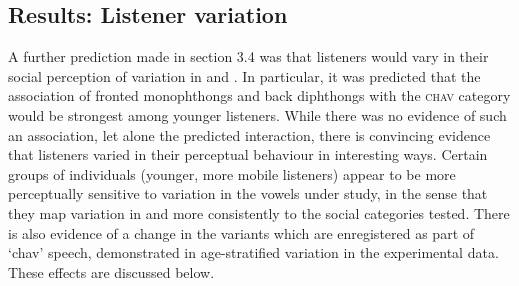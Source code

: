 \documentclass[PWPL]{article}
\begin{document}
\subsection{Results: Listener variation}
A further prediction made in section 3.4 was that listeners would vary in their social perception of variation in  and . In particular, it was predicted that the association of fronted  monophthongs and back  diphthongs with the \textsc{chav} category would be strongest among younger listeners. While there was no evidence of such an association, let alone the predicted interaction, there is convincing evidence that listeners varied in their perceptual behaviour in interesting ways. Certain groups of individuals (younger, more mobile listeners) appear to be more perceptually sensitive to variation in the vowels under study, in the sense that they map variation in  and  more consistently to the social categories tested. There is also evidence of a change in the variants which are enregistered as part of `chav' speech, demonstrated in age-stratified variation in the experimental data. These effects are discussed below.
\end{document}
